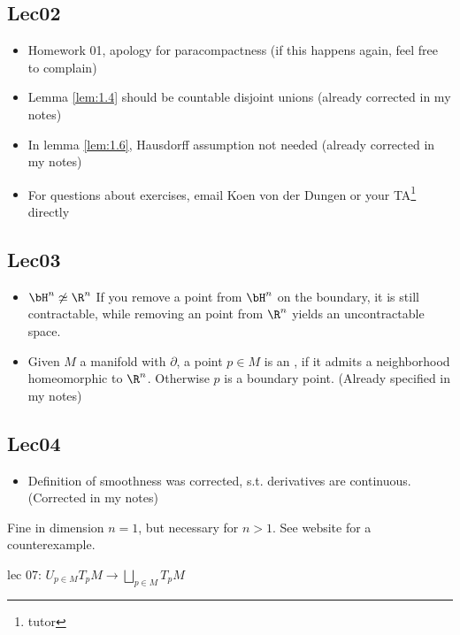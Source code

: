 \subsection*{Lec02}
\begin{itemize}
    \item Homework 01, apology for paracompactness (if this happens again, feel free to complain)
    \item Lemma \ref{lem:1.4} should be countable disjoint unions (already corrected in my notes)
    \item In lemma \ref{lem:1.6}, Hausdorff assumption not needed (already corrected in my notes)
    \item For questions about exercises, email Koen von der Dungen or your TA\footnote{tutor} directly
\end{itemize}

\subsection*{Lec03}

\begin{itemize}
    \item \(\bH^n\not \simeq \R^n\) If you remove a point from \(\bH^n\) on the boundary, it is still contractable, while removing an point from \(\R^n\) yields an uncontractable space.
    \item Given \(M\) a manifold with \(\partial\), a point \(p\in M\) is an , if it admits a neighborhood homeomorphic to \(\R^n\). Otherwise 
          \(p\) is a boundary point. (Already specified in my notes)  
\end{itemize}

\subsection*{Lec04}
\begin{itemize}
    \item Definition of smoothness was corrected, s.t. derivatives are continuous. (Corrected in my notes)
\end{itemize}

\begin{remark}
    Fine in dimension \(n=1\), but necessary for \(n>1\). See website for a counterexample.
\end{remark}

lec 07: \(U_{p\in M} T_p M \to \bigsqcup_{p\in M } T_p M \) %